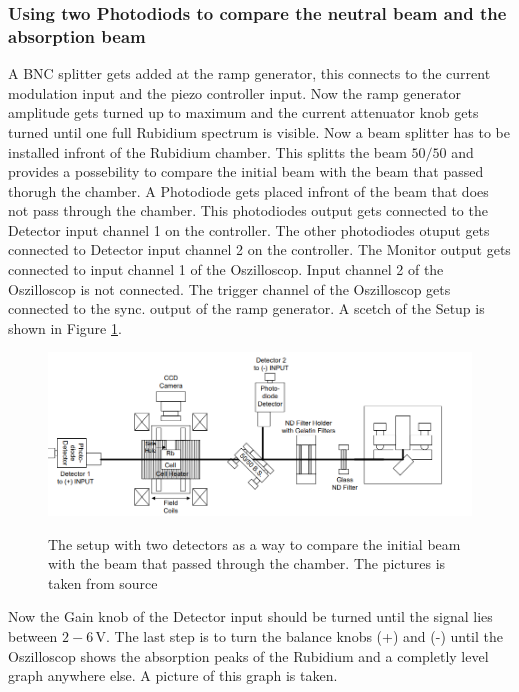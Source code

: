 \subsubsection{Using two Photodiods to compare the neutral beam and the absorption beam}
\label{sec:absorption_spectrum}
A BNC splitter gets added at the ramp generator, this connects to the current modulation input and the piezo controller input.
Now the ramp generator amplitude gets turned up to maximum and the current attenuator knob gets turned until one full Rubidium spectrum is visible.
Now a beam splitter has to be installed infront of the Rubidium chamber.
This splitts the beam $50/50$ and provides a possebility to compare the initial beam with the beam that passed thorugh the chamber.
A Photodiode gets placed infront of the beam that does not pass through the chamber.
This photodiodes output gets connected to the Detector input channel 1 on the controller.
The other photodiodes otuput gets connected to Detector input channel 2 on the controller.
The Monitor output gets connected to input channel 1 of the Oszilloscop.
Input channel 2 of the Oszilloscop is not connected.
The trigger channel of the Oszilloscop gets connected to the sync. output of the ramp generator.
A scetch of the Setup is shown in Figure \ref{fig:setup}.

\begin{figure}
    \centering
    \caption{The setup with two detectors as a way to compare the initial beam with the beam that passed through the chamber. The pictures is taken from source \cite[16]{anleitung_exp}}
    \includegraphics[width=\textwidth]{content/data/setup}
    \label{fig:setup}
\end{figure}

Now the Gain knob of the Detector input should be turned until the signal lies between $2-6 \,\si{\volt}$.
The last step is to turn the balance knobs (+) and (-) until the Oszilloscop shows the absorption peaks of the Rubidium and a completly level graph anywhere else.
A picture of this graph is taken.
